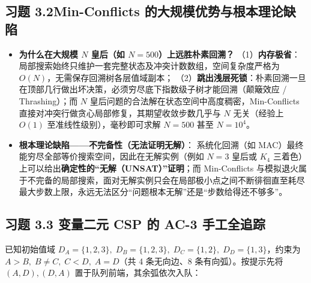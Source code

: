 \subsection*{习题 3.2\quad Min-Conflicts 的大规模优势与根本理论缺陷}
\begin{itemize}
  \item \textbf{为什么在大规模 $N$ 皇后（如 $N=500$）上远胜朴素回溯？}
  （1）\textbf{内存极省}：局部搜索始终只维护一套完整状态及冲突计数数组，空间复杂度严格为 $O(N)$，无需保存回溯树各层值域副本；
  （2）\textbf{跳出浅层死锁}：朴素回溯一旦在顶部几行做出坏决策，必须穷尽底下指数级子树才能回溯（颠簸效应 / Thrashing）；而 $N$ 皇后问题的合法解在状态空间中高度稠密，Min-Conflicts 直接对冲突行做贪心局部修复，其期望收敛步数几乎与 $N$ 无关（经验上 $O(1)$ 至准线性级别），毫秒即可求解 $N=500$ 甚至 $N=10^4$。
  \item \textbf{根本理论缺陷——不完备性（无法证明无解）}：
  系统化回溯（如 MAC）最终能穷尽全部等价搜索空间，因此在无解实例（例如 $N=3$ 皇后或 $K_4$ 三着色）上可以给出\textbf{确定性的“无解（UNSAT）”证明}；而 Min-Conflicts 与模拟退火属于不完备的局部搜索，面对无解实例只会在局部极小点之间不断徘徊直至耗尽最大步数上限，永远无法区分“问题根本无解”还是“步数给得还不够多”。
\end{itemize}

\subsection*{习题 3.3 变量二元 CSP 的 AC-3 手工全追踪}
已知初始值域 $D_A=\{1,2,3\},\; D_B=\{1,2,3\},\; D_C=\{1,2\},\; D_D=\{1,3\}$，约束为 $A>B,\; B\neq C,\; C<D,\; A=D$（共 4 条无向边、8 条有向弧）。按提示先将 $(A,D),(D,A)$ 置于队列前端，其余弧依次入队：

